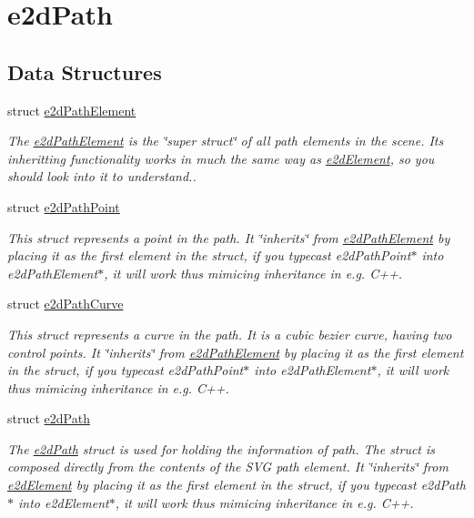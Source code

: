 \hypertarget{group__e2dPath}{\section{e2d\-Path}
\label{group__e2dPath}
}
\subsection*{Data Structures}
\begin{DoxyCompactItemize}
\item 
struct \hyperlink{structe2dPathElement}{e2d\-Path\-Element}
\begin{DoxyCompactList}\small\item\em The \hyperlink{structe2dPathElement}{e2d\-Path\-Element} is the \char`\"{}super struct\char`\"{} of all path elements in the scene. Its inheritting functionality works in much the same way as \hyperlink{structe2dElement}{e2d\-Element}, so you should look into it to understand.. \end{DoxyCompactList}\item 
struct \hyperlink{structe2dPathPoint}{e2d\-Path\-Point}
\begin{DoxyCompactList}\small\item\em This struct represents a point in the path. It \char`\"{}inherits\char`\"{} from \hyperlink{structe2dPathElement}{e2d\-Path\-Element} by placing it as the first element in the struct, if you typecast e2d\-Path\-Point$\ast$ into e2d\-Path\-Element$\ast$, it will work thus mimicing inheritance in e.\-g. C++. \end{DoxyCompactList}\item 
struct \hyperlink{structe2dPathCurve}{e2d\-Path\-Curve}
\begin{DoxyCompactList}\small\item\em This struct represents a curve in the path. It is a cubic bezier curve, having two control points. It \char`\"{}inherits\char`\"{} from \hyperlink{structe2dPathElement}{e2d\-Path\-Element} by placing it as the first element in the struct, if you typecast e2d\-Path\-Point$\ast$ into e2d\-Path\-Element$\ast$, it will work thus mimicing inheritance in e.\-g. C++. \end{DoxyCompactList}\item 
struct \hyperlink{structe2dPath}{e2d\-Path}
\begin{DoxyCompactList}\small\item\em The \hyperlink{structe2dPath}{e2d\-Path} struct is used for holding the information of path. The struct is composed directly from the contents of the S\-V\-G path element. It \char`\"{}inherits\char`\"{} from \hyperlink{structe2dElement}{e2d\-Element} by placing it as the first element in the struct, if you typecast e2d\-Path$\ast$ into e2d\-Element$\ast$, it will work thus mimicing inheritance in e.\-g. C++. \end{DoxyCompactList}\item 

\end{DoxyCompactItemize}
